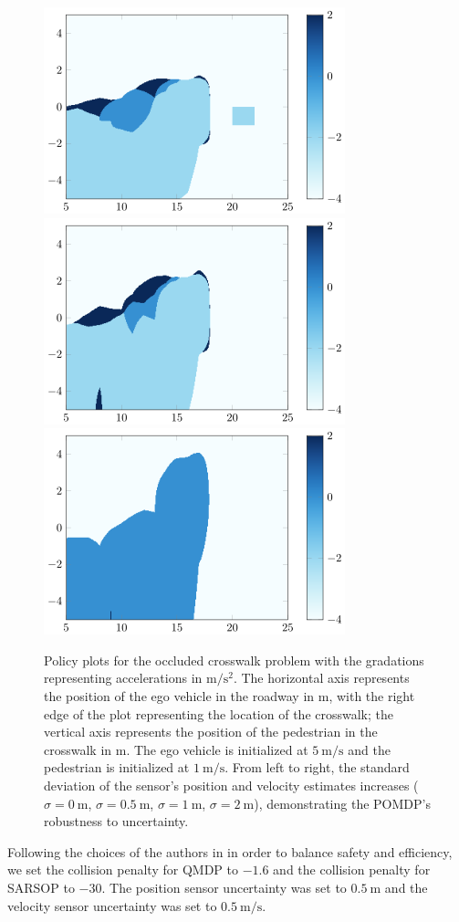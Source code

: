 \documentclass[conference]{IEEEtran}
\begin{document}
\begin{figure}[htbp]
{        \includegraphics[width=0.25\linewidth]{src/plots/sarsop_0_01_1000_noise_05_no_labels.png}
        \includegraphics[width=0.25\linewidth]{src/plots/sarsop_0_01_1000_noise_10_no_labels.png} \includegraphics[width=0.25\linewidth]{src/plots/sarsop_0_01_1000_noise_20_no_labels.png}
    }
    \caption{Policy plots for the occluded crosswalk problem with the gradations representing accelerations in $\si{\meter\per\square\second}$. The horizontal axis represents the position of the ego vehicle in the roadway in $\si{\meter}$, with the right edge of the plot representing the location of the crosswalk; the vertical axis represents the position of the pedestrian in the crosswalk in $\si{\meter}$. The ego vehicle is initialized at $5 ~\si{\meter\per\second}$ and the pedestrian is initialized at $1 ~\si{\meter\per\second}$. From left to right, the standard deviation of the sensor's position and velocity estimates increases ($\sigma = 0~ \si{\meter}$, $\sigma = 0.5~ \si{\meter}$, $\sigma = 1~ \si{\meter}$, $\sigma = 2~ \si{\meter}$), demonstrating the POMDP's robustness to uncertainty.}
    \label{fig:qmdp_sarsop_2}
\end{figure}


Following the choices of the authors in \cite{Bouton2018ScalableDriving} in order to balance safety and efficiency, we set the collision penalty for QMDP to $-1.6$ and the collision penalty for SARSOP to $-30$. The position sensor uncertainty was set to $0.5 ~\si{\meter}$ and the velocity sensor uncertainty was set to $0.5 ~\si{\meter\per\second}$.
\end{document}
